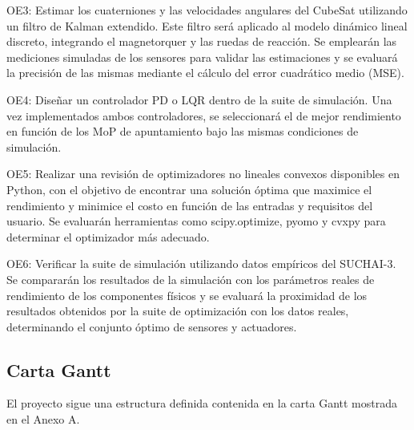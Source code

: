 OE3: Estimar los cuaterniones y las velocidades angulares del CubeSat utilizando un filtro de Kalman extendido. Este filtro será aplicado al modelo dinámico lineal discreto, integrando el magnetorquer y las ruedas de reacción. Se emplearán las mediciones simuladas de los sensores para validar las estimaciones y se evaluará la precisión de las mismas mediante el cálculo del error cuadrático medio (MSE).

OE4: Diseñar un controlador PD o LQR dentro de la suite de simulación. Una vez implementados ambos controladores, se seleccionará el de mejor rendimiento en función de los MoP de apuntamiento bajo las mismas condiciones de simulación.

OE5: Realizar una revisión de optimizadores no lineales convexos disponibles en Python, con el objetivo de encontrar una solución óptima que maximice el rendimiento y minimice el costo en función de las entradas y requisitos del usuario. Se evaluarán herramientas como scipy.optimize, pyomo y cvxpy para determinar el optimizador más adecuado.

OE6: Verificar la suite de simulación utilizando datos empíricos del SUCHAI-3. Se compararán los resultados de la simulación con los parámetros reales de rendimiento de los componentes físicos y se evaluará la proximidad de los resultados obtenidos por la suite de optimización con los datos reales, determinando el conjunto óptimo de sensores y actuadores.
                                                                     \subsection{Carta Gantt}                                                                                                                                                                                                               
El proyecto sigue una estructura definida contenida en la carta Gantt mostrada en el Anexo A.
